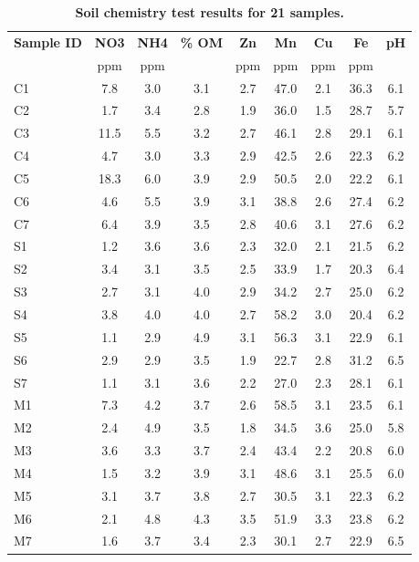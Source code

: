 \documentclass[]{msu-thesis}
\begin{document}
\begin{table}[htbp]
  \centering
  \caption[Soil chemistry test results for 21 samples]{\textbf{Soil
  chemistry test results for 21 samples.}}
    \begin{tabular}{|lcccccccc|}
    \toprule
    \multicolumn{1}{|c}{\textbf{Sample ID}} & \textbf{NO3} & \textbf{NH4} & \textbf{\% OM} & \textbf{Zn} & \textbf{Mn} & \textbf{Cu} & \textbf{Fe} & \textbf{pH} \\
          & ppm   & ppm   &       & ppm   & ppm   & ppm   & ppm   &  \\
    \midrule
    C1    & 7.8   & 3.0   & 3.1   & 2.7   & 47.0  & 2.1   & 36.3  & 6.1 \\
    C2    & 1.7   & 3.4   & 2.8   & 1.9   & 36.0  & 1.5   & 28.7  & 5.7 \\
    C3    & 11.5  & 5.5   & 3.2   & 2.7   & 46.1  & 2.8   & 29.1  & 6.1 \\
    C4    & 4.7   & 3.0   & 3.3   & 2.9   & 42.5  & 2.6   & 22.3  & 6.2 \\
    C5    & 18.3  & 6.0   & 3.9   & 2.9   & 50.5  & 2.0   & 22.2  & 6.1 \\
    C6    & 4.6   & 5.5   & 3.9   & 3.1   & 38.8  & 2.6   & 27.4  & 6.2 \\
    C7    & 6.4   & 3.9   & 3.5   & 2.8   & 40.6  & 3.1   & 27.6  & 6.2 \\
    S1    & 1.2   & 3.6   & 3.6   & 2.3   & 32.0  & 2.1   & 21.5  & 6.2 \\
    S2    & 3.4   & 3.1   & 3.5   & 2.5   & 33.9  & 1.7   & 20.3  & 6.4 \\
    S3    & 2.7   & 3.1   & 4.0   & 2.9   & 34.2  & 2.7   & 25.0  & 6.2 \\
    S4    & 3.8   & 4.0   & 4.0   & 2.7   & 58.2  & 3.0   & 20.4  & 6.2 \\
    S5    & 1.1   & 2.9   & 4.9   & 3.1   & 56.3  & 3.1   & 22.9  & 6.1 \\
    S6    & 2.9   & 2.9   & 3.5   & 1.9   & 22.7  & 2.8   & 31.2  & 6.5 \\
    S7    & 1.1   & 3.1   & 3.6   & 2.2   & 27.0  & 2.3   & 28.1  & 6.1 \\
    M1    & 7.3   & 4.2   & 3.7   & 2.6   & 58.5  & 3.1   & 23.5  & 6.1 \\
    M2    & 2.4   & 4.9   & 3.5   & 1.8   & 34.5  & 3.6   & 25.0  & 5.8 \\
    M3    & 3.6   & 3.3   & 3.7   & 2.4   & 43.4  & 2.2   & 20.8  & 6.0 \\
    M4    & 1.5   & 3.2   & 3.9   & 3.1   & 48.6  & 3.1   & 25.5  & 6.0 \\
    M5    & 3.1   & 3.7   & 3.8   & 2.7   & 30.5  & 3.1   & 22.3  & 6.2 \\
    M6    & 2.1   & 4.8   & 4.3   & 3.5   & 51.9  & 3.3   & 23.8  & 6.2 \\
    M7    & 1.6   & 3.7   & 3.4   & 2.3   & 30.1  & 2.7   & 22.9  & 6.5 \\
    \bottomrule
    \end{tabular}%
  \label{tab:chap4TabS6}%
\end{table}%
\end{document}
